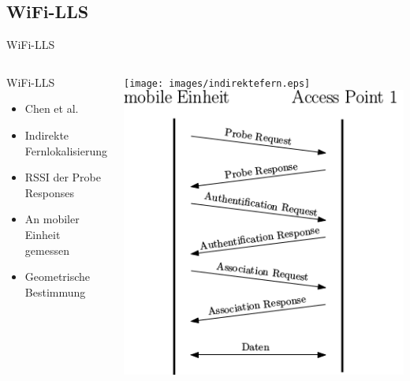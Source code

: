 \documentclass[18pt]{beamer}
\begin{document}
\subsection{WiFi-LLS}
\begin{frame}{WiFi-LLS}
	\begin{columns}
			\begin{block}{WiFi-LLS}
				\begin{itemize}
					\item Chen et al. \cite{chen2007design}
					\item Indirekte Fernlokalisierung
					\item RSSI der Probe Responses
					\item An mobiler Einheit gemessen
					\item Geometrische Bestimmung
				\end{itemize}
			\end{block}
			\centering
			\texttt{[image: images/indirektefern.eps]}
			\includegraphics[width=\textwidth]{images/reupper.png}
	\end{columns}
\end{frame}
\end{document}
